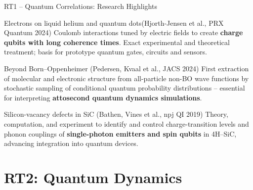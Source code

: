 \documentclass[aspectratio=169,10pt]{beamer}
\begin{document}
\begin{frame}{RT1 -- Quantum Correlations: Research Highlights}
  \begin{block}{Electrons on liquid helium and quantum dots\normalfont\small(Hjorth-Jensen et al., PRX Quantum 2024)}
    Coulomb interactions tuned by electric fields to create
    \textbf{charge qubits with long coherence times}.
    Exact experimental and theoretical treatment; basis for
    prototype quantum gates, circuits and sensors.
  \end{block}
  \vspace{2pt}
  \begin{block}{Beyond Born--Oppenheimer \normalfont\small(Pedersen, Kvaal et al., JACS 2024)}
    First extraction of molecular and electronic structure from
    all-particle non-BO wave functions by stochastic sampling of
    conditional quantum probability distributions -- essential for
    interpreting \textbf{attosecond quantum dynamics simulations}.
  \end{block}
  \vspace{2pt}
  \begin{block}{Silicon-vacancy defects in SiC \normalfont\small(Bathen, Vines et al., npj QI 2019)}
    Theory, computation, and experiment to identify and control
    charge-transition levels and phonon couplings of
    \textbf{single-photon emitters and spin qubits} in 4H--SiC,
    advancing integration into quantum devices.
  \end{block}
\end{frame}

\section{RT2: Quantum Dynamics}
\end{document}
